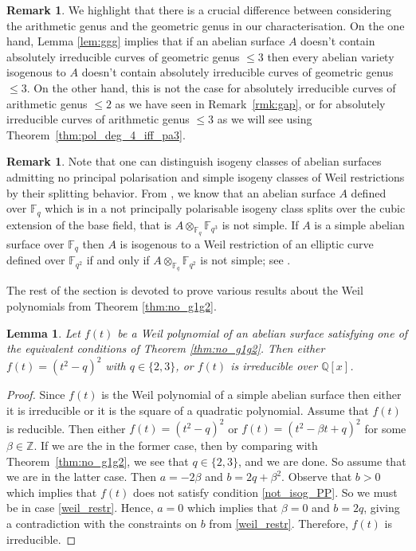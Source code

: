 \documentclass[11pt]{amsart}
\newcommand\F{\mathbb{F}}
\newcommand\Fq{\mathbb{F}_q}
\newcommand\Q{\mathbb{Q}}
\newcommand\Z{\mathbb{Z}}
\theoremstyle{plain}
\newtheorem{lemma}[theorem]{Lemma}
\theoremstyle{definition}
\newtheorem{remark}[theorem]{Remark}
\begin{document}
\begin{remark}\label{rms:genus_2_invariant}
    We highlight that there is a crucial difference between considering the arithmetic genus and the geometric genus in our characterisation. On the one hand, Lemma \ref{lem:ggg} implies that if an abelian surface $A$ doesn't contain absolutely irreducible curves of geometric genus $\leq 3$ then every abelian variety isogenous to $A$ doesn't contain absolutely irreducible curves of geometric genus $\leq 3$. 
    On the other hand, this is not the case for absolutely irreducible curves of arithmetic genus $\leq 2$ as we have seen in Remark~\ref{rmk:gap}, or for absolutely irreducible curves of arithmetic genus $\leq 3$ as we will see using Theorem~\ref{thm:pol_deg_4_iff_pa3}.
\end{remark}

\begin{remark}\label{rmk:good_to_know_Weil_res} 
  Note that one can distinguish isogeny classes of abelian surfaces admitting no principal polarisation and simple isogeny classes of Weil restrictions by their splitting behavior.    From \cite[p.~122]{HMNR08}, we know that an abelian surface $A$ defined over $\Fq$ which is in a not principally polarisable isogeny class splits over the cubic extension of the base field, that is $A\otimes_{\Fq}\F_{q^3}$ is not simple.
    If $A$ is a simple abelian surface over $\F_q$ then $A$ is isogenous to a Weil restriction of an elliptic curve defined over $\F_{q^2}$ if and only if $A\otimes_{\Fq}\F_{q^2}$ is not simple; see \cite[Lemma~4]{HMNR08}.
\end{remark}

The rest of the section is devoted to prove various results about the Weil polynomials from Theorem \ref{thm:no_g1g2}.

\begin{lemma}\label{lemma:f_irred_almost}
    Let $f(t)$ be a Weil polynomial of an abelian surface satisfying one of the equivalent conditions of Theorem \ref{thm:no_g1g2}.
    Then either $f(t) = (t^2-q)^2$ with $q\in \{2,3\}$, or $f(t)$ is irreducible over $\Q[x]$.
\end{lemma}
\begin{proof}
    Since $f(t)$ is the Weil polynomial of a simple abelian surface then either it is irreducible or it is the square of a quadratic polynomial.
    Assume that $f(t)$ is reducible.
    Then either $f(t)=(t^2-q)^2$ or $f(t)=(t^2-\beta t+q)^2$ for some $\beta\in\Z$.
    If we are the in the former case, then by comparing with Theorem~\ref{thm:no_g1g2}, we see that $q\in\{2,3\}$, and we are done.
    So assume that we are in the latter case.
    Then $a=-2\beta$ and $b=2q+\beta^2$.
    Observe that $b>0$ which implies that $f(t)$ does not satisfy condition \ref{not_isog_PP}.
    So we must be in case \ref{weil_restr}.
    Hence, $a=0$ which implies that $\beta=0$ and $b=2q$, giving a contradiction with the constraints on $b$ from \ref{weil_restr}.
    Therefore, $f(t)$ is irreducible.
\end{proof}
\end{document}
